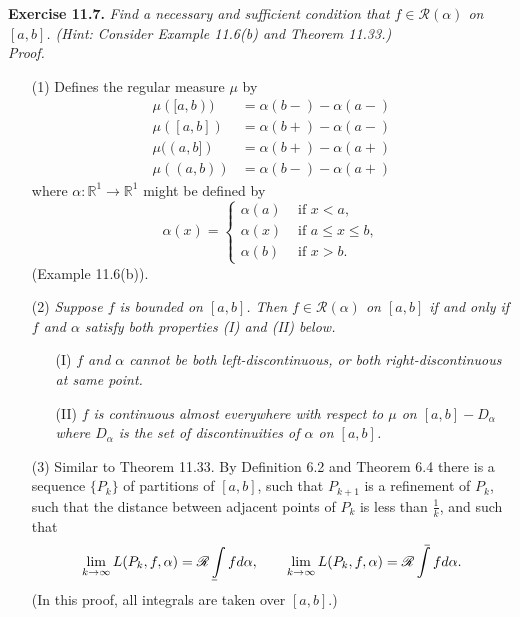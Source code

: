 \documentclass{article}
\def\upint{\mathchoice%
    {\mkern13mu\overline{\vphantom{\intop}\mkern7mu}\mkern-20mu}%
    {\mkern7mu\overline{\vphantom{\intop}\mkern7mu}\mkern-14mu}%
    {\mkern7mu\overline{\vphantom{\intop}\mkern7mu}\mkern-14mu}%
    {\mkern7mu\overline{\vphantom{\intop}\mkern7mu}\mkern-14mu}%
  \int}
\def\lowint{\mkern3mu\underline{\vphantom{\intop}\mkern7mu}\mkern-10mu\int}
\begin{document}



\textbf{Exercise 11.7.}
\emph{Find a necessary and sufficient condition that $f \in \mathscr{R}(\alpha)$ on $[a,b]$.
(Hint: Consider Example 11.6(b) and Theorem 11.33.)} \\

\emph{Proof.}
\begin{enumerate}
\item[(1)]
  Defines the regular measure $\mu$ by
  \begin{align*}
    \mu([a,b)) &= \alpha(b-) - \alpha(a-) \\
    \mu([a,b]) &= \alpha(b+) - \alpha(a-) \\
    \mu((a,b]) &= \alpha(b+) - \alpha(a+) \\
    \mu((a,b)) &= \alpha(b-) - \alpha(a+)
  \end{align*}
  where $\alpha: \mathbb{R}^1 \to \mathbb{R}^1$ might be defined by
  \begin{equation*}
    \alpha(x) =
      \begin{cases}
        \alpha(a) & \text{ if $x < a$}, \\
        \alpha(x) & \text{ if $a \leq x \leq b$}, \\
        \alpha(b) & \text{ if $x > b$}.
      \end{cases}
  \end{equation*}
  (Example 11.6(b)).

\item[(2)]
  \emph{Suppose $f$ is bounded on $[a,b]$.
  Then $f \in \mathscr{R}(\alpha)$ on $[a,b]$ if and only if
  $f$ and $\alpha$ satisfy both properties (I) and (II) below.}
  \begin{enumerate}
  \item[(I)]
    \emph{$f$ and $\alpha$
    cannot be both left-discontinuous, or both right-discontinuous at same point.}
  \item[(II)]
    \emph{$f$ is continuous almost everywhere with respect to $\mu$ on $[a,b] - D_{\alpha}$
    where $D_{\alpha}$ is the set of discontinuities of $\alpha$ on $[a,b]$.}
  \end{enumerate}

\item[(3)]
  Similar to Theorem 11.33.
  By Definition 6.2 and Theorem 6.4 there is a sequence $\{P_k\}$ of partitions of $[a,b]$,
  such that $P_{k+1}$ is a refinement of $P_k$,
  such that the distance between adjacent points of $P_k$ is less than $\frac{1}{k}$,
  and such that
  \[
    \lim_{k \to \infty} L(P_k,f,\alpha) = \mathscr{R}\lowint f d\alpha,
    \qquad
    \lim_{k \to \infty} L(P_k,f,\alpha) = \mathscr{R}\upint f d\alpha.
  \]
  (In this proof, all integrals are taken over $[a,b]$.)


\end{enumerate}
\end{document}
